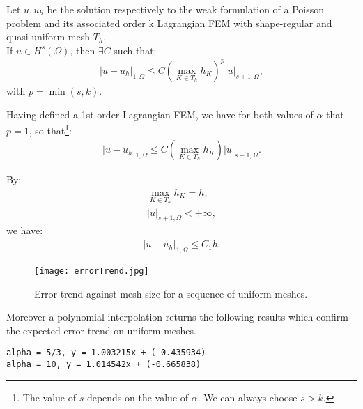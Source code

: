 \begin{theorem}
	Let $u, u_h$ be the solution respectively to the weak formulation of a Poisson problem and its associated order k Lagrangian FEM with shape-regular and quasi-uniform mesh $T_h$. \\ 
	If $u \in H^s(\Omega)$, then $\exists C$ such that:
	\begin{gather}
		|u - u_h|_{1, \Omega} \le C (\max_{K \in T_h} h_K)^{p}|u|_{s+1, \Omega},
	\end{gather}
	with $p = \min(s, k)$.
\end{theorem}

Having defined a 1st-order Lagrangian FEM, we have for both values of $\alpha$ that $p = 1$, so that\footnote{The value of $s$ depends on the value of $\alpha$. We can always choose $s > k$.}:
\begin{gather}
	|u - u_h|_{1, \Omega} \le C (\max_{K \in T_h} h_K)|u|_{s+1, \Omega}.
\end{gather}

By:
\begin{gather}
	\max_{K \in T_h} h_K = h, \\
	|u|_{s+1, \Omega} < +\infty,
\end{gather}
we have:
\begin{gather}
	|u - u_h|_{1, \Omega} \le C_1 h.
\end{gather}

\begin{figure}[!ht]
	\centering
	\texttt{[image: errorTrend.jpg]}
	\caption{Error trend against mesh size for a sequence of uniform meshes.}
\end{figure}

\noindent Moreover a polynomial interpolation returns the following results which confirm the expected error trend on uniform meshes.
\begin{verbatim}
alpha = 5/3, y = 1.003215x + (-0.435934)
alpha = 10, y = 1.014542x + (-0.665838)
\end{verbatim}